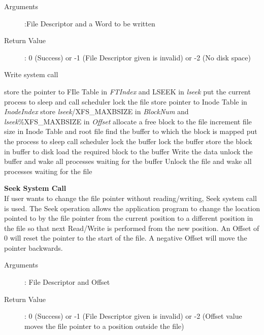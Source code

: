 \documentclass[10pt]{article}
\begin{document}
\begin{description}
	\item[Arguments]:File Descriptor and a Word to be written
	\item[Return Value]: 0 (Success) or -1 (File Descriptor given is invalid) or -2 (No disk space)
\end{description} 
\begin{algorithm}
\caption{Write system call}
\begin{algorithmic}
\ENDIF
{}
\ELSE 
    \STATE store the pointer to FIle Table in  \textit{FTIndex} and LSEEK in  \textit{lseek}
\ENDIF
{}
    \STATE put the current process to sleep and call scheduler
\ENDWHILE
\STATE lock the file
\STATE store pointer to Inode Table in  \textit{InodeIndex}
\STATE store \textit{lseek}/XFS\_MAXBSIZE in \textit{BlockNum} and \textit{lseek}\%XFS\_MAXBSIZE in \textit{Offset}
    \ELSE
        \STATE allocate a free block to the file
        \STATE increment file size in Inode Table and root file
    \ENDIF
\ENDIF
\STATE find the buffer to which the block is mapped
            \STATE put the process to sleep
            \STATE call scheduler
        \ENDWHILE
        \STATE lock the buffer
    \ENDIF
\ENDIF
\STATE lock the buffer
        \STATE store the block in buffer to disk
    \ENDIF
    \STATE load the required block to the buffer
\ENDIF
\STATE Write the data 
\STATE unlock the buffer and wake all processes waiting for the buffer
\STATE Unlock the file and wake all processes waiting for the file
\end{algorithmic}
\end{algorithm}
\textbf{Seek System Call}\\
If user wants to change the file pointer without reading/writing, Seek system call is used. The Seek operation allows the application program to change the location pointed to by the file pointer from the current position to a different position in the file so that next Read/Write is performed from the new position. An Offset of 0 will reset the pointer to the start of the file. A negative Offset will move the pointer backwards.
\begin{description}
	\item[Arguments]: File Descriptor and Offset
	\item[Return Value]: 0 (Success) or -1 (File Descriptor given is invalid) or -2 (Offset value moves the file pointer to a position outside the file)
\end{description} 
\end{document}
